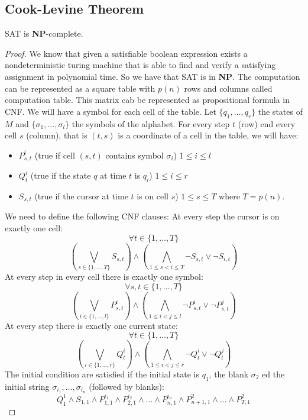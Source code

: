 \documentclass[12pt]{article}
\begin{document}
\subsection{Cook-Levine Theorem}
\begin{defbox}
  \textsc{SAT} is \textbf{NP}-complete.
\end{defbox}
\begin{proof}
  We know that given a satisfiable boolean expression exists a nondeterministic turing machine that is able to find and verify a satisfying assignment in polynomial time. So we have that \textsc{SAT} is in \textbf{NP}. The computation can be represented as a square table with $p(n)$ rows and columns called computation table.  This matrix cab be represented as propositional formula in CNF. We will have a symbol for each cell of the table. Let $\{q_1,\dots,q_r\}$ the states of $M$ and $\{\sigma_1,\dots,\sigma_l\}$ the symbols of the alphabet. For every step $t$ (row) end every cell $s$ (column), that is $(t,s)$ is a coordinate of a cell in the table, we will have:
  \begin{itemize}
    \item $P^i_{s,t}$ (true if cell $(s,t)$ contains symbol $\sigma_i$) $1\le i\le l$
    \item $Q^i_{t}$ (true if the state $q$ at time $t$ is $q_i$) $1\le i\le r$
    \item $S_{s,t}$ (true if the cursor at time $t$ is on cell $s$) $1\le s\le T$ where $T=p(n)$.
  \end{itemize}
  We need to define the following CNF clauses:
  At every step the cursor is on exactly one cell:
  $$\forall t\in\{1,\dots,T\}$$
  \[
\left( \bigvee_{s \in \{1, \dots, T\}} S_{s,t} \right) \land \left( \bigwedge_{1 \leq s < i \leq T} \neg S_{s,t} \lor \neg S_{i,t} \right)
\]
At every step in every cell there is exactly one symbol:
$$\forall s,t\in\{1,\dots,T\}$$
\[
\left( \bigvee_{i \in \{1, \dots, l\}} P^i_{s,t} \right) \land \left( \bigwedge_{1 \leq i < j \leq l} \neg P^i_{s,t} \lor \neg P^j_{s,t} \right)
\]
At every step there is exactly one current state:
$$\forall t\in\{1,\dots,T\}$$
\[
\left( \bigvee_{i \in \{1, \dots, r\}} Q^i_{t} \right) \land \left( \bigwedge_{1 \leq i < j \leq r} \neg Q^i_{t} \lor \neg Q^j_{t} \right)
\]
The initial condition are satisfied if the initial state is $q_1$, the blank $\sigma_2$ ed the initial string $\sigma_{i_1},\dots,\sigma_{i_n}$ (followed by blanks):
$$Q^1_1\land S_{1,1}\land P^{i_1}_{1,1}\land P^{i_2}_{2,1}\land\dots\land P^{i_n}_{n,1}\land P^2_{n+1,1}\land\dots\land P^2_{T,1}$$

\end{proof}
\end{document}
